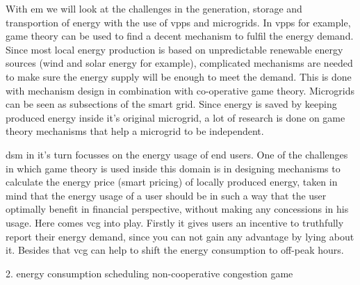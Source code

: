 With \ac{em} we will look at the challenges in the generation, storage and transportion of energy with the use of \acp{vpp} and microgrids.
In \acp{vpp} for example, game theory can be used to find a decent mechanism to fulfil the energy demand. Since most local energy production is based on unpredictable renewable energy sources (wind and solar energy for example), complicated mechanisms are needed to make sure the energy supply will be enough to meet the demand. This is done with mechanism design in combination with co-operative game theory. Microgrids can be seen as subsections of the smart grid. Since energy is saved by keeping produced energy inside it's original microgrid, a lot of research is done on game theory mechanisms that help a microgrid to be independent.

\ac{dsm} in it's turn focusses on the energy usage of end users. One of the challenges in which game theory is used inside this domain is in designing mechanisms to calculate the energy price (smart pricing) of locally produced energy, taken in mind that the energy usage of a user should be in such a way that the user optimally benefit in financial perspective, without making any concessions in his usage. Here comes \ac{vcg} into play. Firstly it gives users an incentive to truthfully report their energy demand, since you can not gain any advantage by lying about it. Besides that \ac{vcg} can help to shift the energy consumption to off-peak hours.  

2. energy consumption scheduling
non-cooperative congestion game
